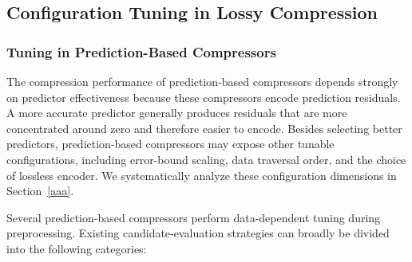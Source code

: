 \subsection{Configuration Tuning in Lossy Compression}\label{sec:related work:tuning}

\subsubsection{Tuning in Prediction-Based Compressors}\mbox{}

The compression performance of prediction-based compressors depends strongly on predictor effectiveness because these compressors encode prediction residuals. A more accurate predictor generally produces residuals that are more concentrated around zero and therefore easier to encode. Besides selecting better predictors, prediction-based compressors may expose other tunable configurations, including error-bound scaling, data traversal order, and the choice of lossless encoder. We systematically analyze these configuration dimensions in Section~\ref{aaa}.

Several prediction-based compressors perform data-dependent tuning during preprocessing. Existing candidate-evaluation strategies can broadly be divided into the following categories:

